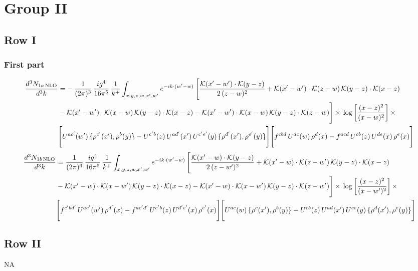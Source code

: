 \documentclass[9pt]{article}
\numberwithin{equation}{section}
\begin{document}
\section{Group II}
\subsection{Row I}
\subsubsection{First part}
\begin{align}
\frac{d^{3}N_{1a\,\rm NLO}}{d^{3}k} & = -\,\frac{1}{(2\pi)^{3}}\,\frac{ig^{4}}{16\pi^{5}}\,\frac{1}{k^{+}}\int_{x,y,z,w,x',w'} e^{-ik\cdot(w'-w)}\,\Bigg[\frac{\mathcal{K}(x'-w')\cdot\mathcal{K}(y-z)}{2\,(z-w)^{2}}+\mathcal{K}(x'-w')\cdot\mathcal{K}(z-w)\,\mathcal{K}(y-z)\cdot\mathcal{K}(x-z)\notag \\ & -\mathcal{K}(x'-w')\cdot\mathcal{K}(x-w)\,\mathcal{K}(y-z)\cdot\mathcal{K}(x-z)-\mathcal{K}(x'-w')\cdot\mathcal{K}(x-w)\,\mathcal{K}(y-z)\cdot\mathcal{K}(z-w)\Bigg]\times\,\log\left[\frac{(x-z)^{2}}{(x-w)^{2}}\right]\times\,\notag \\
&\Bigg[U^{ac'}(w')\,\{\rho^{c'}(x'),\rho^{b}(y)\}-U^{c'b}(z)\,U^{ad'}(x')\,U^{c'e'}(y)\,\{\rho^{d'}(x'),\rho^{e'}(y)\}\Bigg]\Bigg[f^{cbd}\,U^{ac}(w)\,\rho^{d}(x)-f^{acd}\,U^{cb}(z)\,U^{de}(x)\,\rho^{e}(x)\Bigg]
\end{align}
\begin{align}
\frac{d^{3}N_{1b\,\rm NLO}}{d^{3}k} & = \frac{1}{(2\pi)^{3}}\,\frac{ig^{4}}{16\pi^{5}}\,\frac{1}{k^{+}}\int_{x,y,z,w,x',w'} e^{-ik\cdot(w'-w)}\,\Bigg[\frac{\mathcal{K}(x'-w)\cdot\mathcal{K}(y-z)}{2\,(z-w')^{2}}+\mathcal{K}(x'-w)\cdot\mathcal{K}(z-w')\,\mathcal{K}(y-z)\cdot\mathcal{K}(x-z)\notag \\ & -\mathcal{K}(x'-w)\cdot\mathcal{K}(x-w')\,\mathcal{K}(y-z)\cdot\mathcal{K}(x-z)-\mathcal{K}(x'-w)\cdot\mathcal{K}(x-w')\,\mathcal{K}(y-z)\cdot\mathcal{K}(z-w')\Bigg]\times\,\log\left[\frac{(x-z)^{2}}{(x-w')^{2}}\right]\times\,\notag \\
&\Bigg[f^{c'bd'}\,U^{ac'}(w')\,\rho^{d'}(x)-f^{ac'd'}\,U^{c'b}(z)\,U^{d'e'}(x)\,\rho^{e'}(x)\Bigg]\Bigg[U^{ac}(w)\,\{\rho^{c}(x'),\rho^{b}(y)\}-U^{cb}(z)\,U^{ad}(x')\,U^{ce}(y)\,\{\rho^{d}(x'),\rho^{e}(y)\}\Bigg]
\end{align}
\subsection{Row II}
\textsc{NA}
\end{document}
